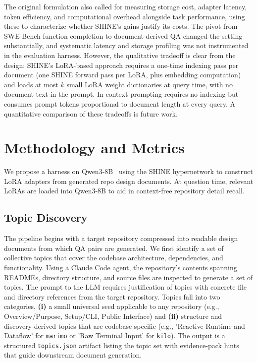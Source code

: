 \documentclass[conference,10.5pt]{IEEEtran}
\begin{document}
The original formulation also called for measuring storage cost, adapter
latency, token efficiency, and computational overhead alongside task
performance, using these to characterize whether SHINE's gains justify
its costs. The pivot from SWE-Bench function completion to
document-derived QA changed the setting substantially, and systematic
latency and storage profiling was not instrumented in the evaluation
harness. However, the qualitative tradeoff is clear from the design:
SHINE's LoRA-based approach requires a one-time indexing pass per
document (one SHINE forward pass per LoRA, plus embedding computation)
and loads at most $k$ small LoRA weight dictionaries at query time, with
no document text in the prompt. In-context prompting requires no indexing
but consumes prompt tokens proportional to document length at every
query. A quantitative comparison of these tradeoffs is future work.

\section{Methodology and Metrics}

We propose a harness on Qwen3-8B~\cite{yangQwen3TechnicalReport2025} using the SHINE hypernetwork to construct LoRA adapters from generated repo design documents. At question time, relevant LoRAs are loaded into Qwen3-8B to aid in context-free repository detail recall.

\subsection{Topic Discovery}
The pipeline begins with a target repository compressed into readable design documents from which QA pairs are generated. We first identify a set of collective topics that cover the codebase architecture, dependencies, and functionality. Using a Claude Code agent, the repository's contents spanning READMEs, directory structure, and source files are inspected to generate a set of topics. The prompt to the LLM requires justification of topics with concrete file and directory references from the target repository. Topics fall into two categories, \textbf{(i)} a small universal seed applicable to any repository (e.g., Overview/Purpose, Setup/CLI, Public Interface) and \textbf{(ii)} structure and discovery-derived topics that are codebase specific (e.g., 'Reactive Runtime and Dataflow' for \texttt{marimo} or 'Raw Terminal Input' for \texttt{kilo}). The output is a structured \texttt{topics.json} artifact listing the topic set with evidence-pack hints that guide downstream document generation.
\end{document}
